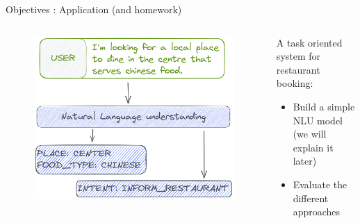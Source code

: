 \documentclass[10pt,aspectratio=169]{beamer}
\begin{document}
\begin{frame}{Objectives : Application (and homework)}
    \begin{columns}
        \begin{column}{0.5\textwidth}
            \begin{figure}
                \centering
                \includegraphics[width=.9\textwidth]{media/TP-exemple.png}
            \end{figure}
        \end{column}
        \begin{column}{0.5\textwidth}
            \begin{block}{A task oriented system for restaurant booking:}
                \begin{itemize}
                    \item Build a simple NLU model (we will explain it later)
                    \item Evaluate the different approaches
                    
                \end{itemize}
            \end{block}
        \end{column}
    \end{columns}
\end{frame}
\end{document}
